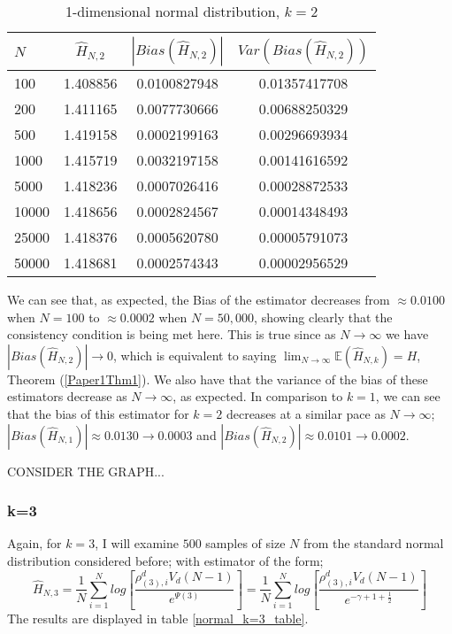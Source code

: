 \documentclass{article}
\begin{document}
\begin{table}
\caption{1-dimensional normal distribution, $k=2$} \label{normal_k=2_table}
\begin{center}
\begin{tabular}{| l | c c c|} 
\toprule
$N$ & $\hat{H}_{N, 2}$ & $|Bias(\hat{H}_{N, 2})|$ & $Var(Bias(\hat{H}_{N, 2}))$ \\
\midrule[1pt]
100     & 1.408856     & 0.0100827948     & 0.01357417708  \\
200     & 1.411165     & 0.0077730666     & 0.00688250329  \\
500     & 1.419158     & 0.0002199163     & 0.00296693934  \\
1000    & 1.415719     & 0.0032197158     & 0.00141616592  \\
5000    & 1.418236     & 0.0007026416     & 0.00028872533  \\
10000   & 1.418656     & 0.0002824567     & 0.00014348493  \\
25000   & 1.418376     & 0.0005620780     & 0.00005791073  \\
50000   & 1.418681     & 0.0002574343     & 0.00002956529  \\
\hline
\end{tabular}
\end{center}
\end{table}


We can see that, as expected, the Bias of the estimator decreases from $\approx 0.0100$ when $N=100$ to $\approx 0.0002$ when $N=50,000$, showing clearly that the consistency condition is being met here. This is true since as $N \to \infty$ we have $|Bias(\hat{H}_{N, 2})| \to 0$, which is equivalent to saying $\lim_{N \to \infty} \mathbb{E} (\hat{H}_{N, k}) = H$, Theorem (\ref{Paper1Thm1}). We also have that the variance of the bias of these estimators decrease as $N \to \infty$, as expected. In comparison to $k=1$, we can see that the bias of this estimator for $k=2$ decreases at a similar pace as $N \to \infty$; $|Bias(\hat{H}_{N, 1})| \approx 0.0130 \to 0.0003$ and $|Bias(\hat{H}_{N, 2})| \approx 0.0101 \to 0.0002$. 

CONSIDER THE GRAPH...

\subsubsection{k=3} \label{N_k=3}

Again, for $k=3$, I will examine $500$ samples of size $N$ from the standard normal distribution considered before; with estimator of the form;
\begin{equation}
\hat{H}_{N, 3} = \frac{1}{N} \sum_{i=1}^{N} log \left[ \frac{\rho_{(3),i}^{d} V_{d} (N-1)}{e^{\Psi(3)}} \right] = \frac{1}{N} \sum_{i=1}^{N} log \left[ \frac{\rho_{(3),i}^{d} V_{d} (N-1)}{e^{-\gamma + 1 + \frac{1}{2}}} \right] \nonumber
\end{equation}
The results are displayed in table \ref{normal_k=3_table}. 
\end{document}
